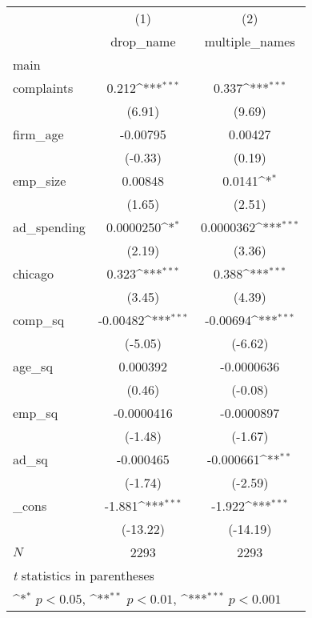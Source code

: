 {
\def\sym#1{\ifmmode^{#1}\else\(^{#1}\)\fi}
\begin{tabular}{l*{2}{c}}
\hline\hline
            &\multicolumn{1}{c}{(1)}&\multicolumn{1}{c}{(2)}\\
            &\multicolumn{1}{c}{drop\_name}&\multicolumn{1}{c}{multiple\_names}\\
\hline
main        &                     &                     \\
complaints  &       0.212\sym{***}&       0.337\sym{***}\\
            &      (6.91)         &      (9.69)         \\
[1em]
firm\_age    &    -0.00795         &     0.00427         \\
            &     (-0.33)         &      (0.19)         \\
[1em]
emp\_size    &     0.00848         &      0.0141\sym{*}  \\
            &      (1.65)         &      (2.51)         \\
[1em]
ad\_spending &   0.0000250\sym{*}  &   0.0000362\sym{***}\\
            &      (2.19)         &      (3.36)         \\
[1em]
chicago     &       0.323\sym{***}&       0.388\sym{***}\\
            &      (3.45)         &      (4.39)         \\
[1em]
comp\_sq     &    -0.00482\sym{***}&    -0.00694\sym{***}\\
            &     (-5.05)         &     (-6.62)         \\
[1em]
age\_sq      &    0.000392         &  -0.0000636         \\
            &      (0.46)         &     (-0.08)         \\
[1em]
emp\_sq      &  -0.0000416         &  -0.0000897         \\
            &     (-1.48)         &     (-1.67)         \\
[1em]
ad\_sq       &   -0.000465         &   -0.000661\sym{**} \\
            &     (-1.74)         &     (-2.59)         \\
[1em]
\_cons      &      -1.881\sym{***}&      -1.922\sym{***}\\
            &    (-13.22)         &    (-14.19)         \\
\hline
\(N\)       &        2293         &        2293         \\
\hline\hline
\multicolumn{3}{l}{\footnotesize \textit{t} statistics in parentheses}\\
\multicolumn{3}{l}{\footnotesize \sym{*} \(p<0.05\), \sym{**} \(p<0.01\), \sym{***} \(p<0.001\)}\\
\end{tabular}
}

